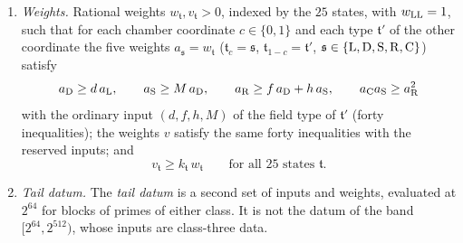 \begin{definition}
\begin{enumerate}[label=(\alph*)]
\begin{itemize}
  has field type $\varphi$ (LL20 and LL10, FL21 and FL11, EL21 and EL11).
 \item $(f_\varphi,h_\varphi,M_\varphi,t_\varphi)$ are row coefficients of
  \ref{it:record:upper-F5} valid for the two-layer and for the one-layer rows at
  $\varphi$; in particular $M_\varphi\ge H+t_\varphi$ and $t_\varphi H<1$ for both.
 \item The reserved input uses the one-layer quantities alone: LL10, FL11 or EL11
  and the one-layer row.
 \item $k_{\mathfrak t}$ is the block cap $k_{\mathfrak f(\mathfrak t)}$ of the
  layer cut of the field pair $\mathfrak f(\mathfrak t)$ (LL22, FL22, EL22, FF22,
  FE22, EE22). The exceptions are $k_{\rm LR}=k_{\rm RL}=k_{\rm G}$ and
  $k_{\rm LC}=k_{\rm CL}=k_{\rm C}$, the observed merge and constant caps of EL22
  (\cref{prop:observed-caps}).
 \end{itemize}
 The root entries $d_{\rm L}$ and $k_{\rm LL}$ are the caps of
 \cref{subsec:record:upper_root}. The values are recorded with the band
 (\cref{cert:upper-completion}) and summarized in \cref{tab:data:upper-bands}.
\item \emph{Weights.} Rational weights $w_{\mathfrak t},v_{\mathfrak t}>0$, indexed
 by the $25$ states, with $w_{\rm LL}=1$, such that for each chamber coordinate
 $c\in\{0,1\}$ and each type $\mathfrak t'$ of the other coordinate the five
 weights $a_{\mathfrak s}=w_{\mathfrak t}$ ($\mathfrak t_c=\mathfrak s$,
 $\mathfrak t_{1-c}=\mathfrak t'$, $\mathfrak s\in\{\rm L,D,S,R,C\}$) satisfy
 \begin{equation}\label{eq:upper-slice}
  a_{\rm D}\ge d\,a_{\rm L},\qquad a_{\rm S}\ge M\,a_{\rm D},\qquad
  a_{\rm R}\ge f\,a_{\rm D}+h\,a_{\rm S},\qquad a_{\rm C}a_{\rm S}\ge a_{\rm R}^2
 \end{equation}
 with the ordinary input $(d,f,h,M)$ of the field type of $\mathfrak t'$ (forty
 inequalities); the weights $v$ satisfy the same forty inequalities with the
 reserved inputs; and
 \begin{equation}\label{eq:independent-fold-domination}
  v_{\mathfrak t}\ge k_{\mathfrak t}\,w_{\mathfrak t}\qquad
  \text{for all $25$ states $\mathfrak t$.}
 \end{equation}
\item \emph{Tail datum.} The \emph{tail datum} is a second set of inputs and
 weights, evaluated at $2^{64}$ for blocks of primes of either class. It is not
 the datum of the band $[2^{64},2^{512})$, whose inputs are class-three data.
 \begin{itemize}

\end{itemize}
\end{enumerate}
\end{definition}
